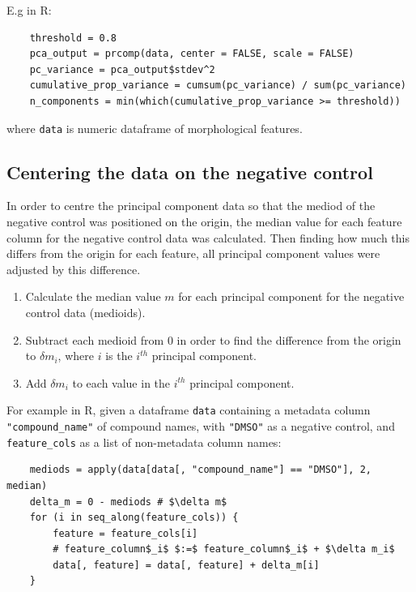 \documentclass[a4paper,11pt,twoside,openright]{scrbook}
\begin{document}
E.g in R:

\begin{verbatim}
    threshold = 0.8
    pca_output = prcomp(data, center = FALSE, scale = FALSE)
    pc_variance = pca_output$stdev^2 
    cumulative_prop_variance = cumsum(pc_variance) / sum(pc_variance)
    n_components = min(which(cumulative_prop_variance >= threshold)) 
\end{verbatim}
where \texttt{data} is numeric dataframe of morphological features.


\subsection{Centering the data on the negative control}

In order to centre the principal component data so that the mediod of the negative control was positioned on the 
origin, the median value for each feature column for the negative control data was calculated.
Then finding how much this differs from the origin for each feature, all principal component values were adjusted by 
this difference.

\begin{enumerate}
    \item Calculate the median value $m$ for each principal component for the negative control data (medioids).
    \item Subtract each medioid from 0 in order to find the difference from the origin to $\delta m_i$, where $i$ is 
the $i^{th}$ principal component.
    \item Add $\delta m_i$ to each value in the $i^{th}$ principal component.
\end{enumerate}

For example in R, given a dataframe \texttt{data} containing a metadata column \texttt{"compound\_name"} of compound 
names, with \texttt{"DMSO"} as a negative control, and \texttt{feature\_cols} as a list of non-metadata column names:


\begin{verbatim}
    mediods = apply(data[data[, "compound_name"] == "DMSO"], 2, median)
    delta_m = 0 - mediods # $\delta m$
    for (i in seq_along(feature_cols)) {
        feature = feature_cols[i]
        # feature_column$_i$ $:=$ feature_column$_i$ + $\delta m_i$
        data[, feature] = data[, feature] + delta_m[i]
    }
\end{verbatim}
\end{document}
